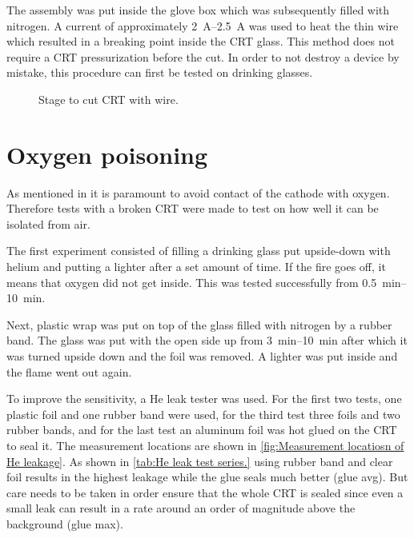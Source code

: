 The assembly was put inside the glove box which was subsequently filled with nitrogen. A current of approximately \SIrange{2}{2.5}{\ampere} was used to heat the thin wire which resulted in a breaking point inside the CRT glass. This method does not require a CRT pressurization before the cut. In order to not destroy a device by mistake, this procedure can first be tested on drinking glasses.

\begin{figure}[h]
	
	\caption{Stage to cut CRT with wire.}
	\label{fig:Stage to cut CRT with wire}
\end{figure}


\section{Oxygen poisoning}
\label{sec:Oxygen poisoning}


As mentioned in \label{ch:Cathodic Ray Tube Basics} it is paramount to avoid contact of the cathode with oxygen. Therefore tests with a broken CRT were made to test on how well it can be isolated from air.

The first experiment consisted of filling a drinking glass put upside-down with helium and putting a lighter after a set amount of time. If the fire goes off, it means that oxygen did not get inside. This was tested successfully from \SIrange{0.5}{10}{\minute}.

Next, plastic wrap was put on top of the glass filled with nitrogen by a rubber band. The glass was put with the open side up from \SIrange{3}{10}{\minute} after which it was turned upside down and the foil was removed. A lighter was put inside and the flame went out again.

To improve the sensitivity, a He leak tester was used. For the first two tests, one plastic foil and one rubber band were used, for the third test three foils and two rubber bands, and for the last test an aluminum foil was hot glued on the CRT to seal it. The measurement locations are shown in \cref{fig:Measurement locatiosn of He leakage}. As shown in \cref{tab:He leak test series.} using rubber band and clear foil results in the highest leakage while the glue seals much better (glue avg). But care needs to be taken in order ensure that the whole CRT is sealed since even a small leak can result in a rate around an order of magnitude above the background (glue max).

